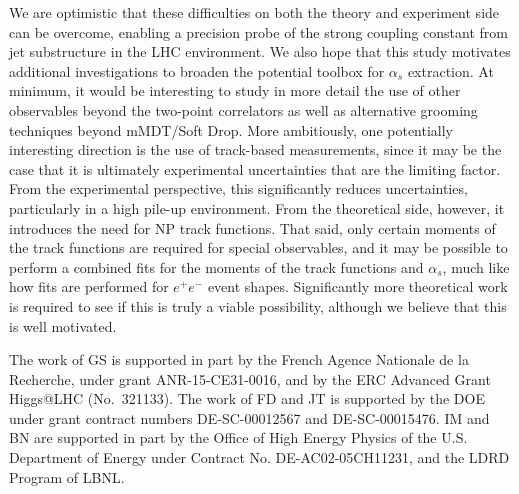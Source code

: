 \documentclass[11pt,letterpaper]{article}
\begin{document}
We are optimistic that these difficulties on both the theory and experiment side can be overcome, enabling a precision probe of the strong coupling constant from jet substructure in the LHC environment.
%
We also hope that this study motivates additional investigations to broaden the potential toolbox for $\alpha_s$ extraction.
%
At minimum, it would be interesting to study in more detail the use of other observables beyond the two-point correlators as well as alternative grooming techniques beyond mMDT/Soft Drop.
%
More ambitiously, one potentially interesting direction is the use of track-based measurements, since it may be the case that it is ultimately experimental uncertainties that are the limiting factor.
%
From the experimental perspective, this significantly reduces uncertainties, particularly in a high pile-up environment.
%
From the theoretical side, however, it introduces the need for NP track functions.
%
That said, only certain moments of the track functions are required for special observables, and it may be possible to perform a combined fits for the moments of the track functions and $\alpha_s$, much like how fits are performed for $e^+e^-$ event shapes.
%
Significantly more theoretical work is required to see if this is truly a viable possibility, although we believe that this is well motivated.

\begin{acknowledgments}

The work of GS is supported in part by the French Agence Nationale de la Recherche,
under grant ANR-15-CE31-0016, and by the ERC Advanced Grant Higgs@LHC
(No.\ 321133).
%
The work of FD and JT is supported by the DOE under grant contract numbers DE-SC-00012567 and DE-SC-00015476.
%
IM and BN are supported in part by the Office of High Energy Physics of the U.S. Department of Energy under Contract No. DE-AC02-05CH11231, and the LDRD Program of LBNL.

\end{acknowledgments}



\end{document}
